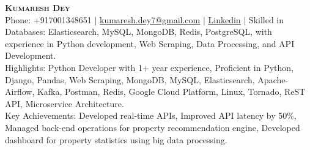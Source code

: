 \documentclass[letterpaper,11pt]{article}
\begin{document}

\begin{center}
	\textbf{\Huge \scshape Kumaresh Dey} \\ \vspace{1pt}
	\small Phone: +917001348651 $|$ \href{mailto:kumaresh.dey7@gmail.com}{\underline{kumaresh.dey7@gmail.com}} $|$
	\href{https://www.linkedin.com/in/kumareshdey}{\underline{Linkedin}} $|$ 
	\small Skilled in Databases: Elasticsearch, MySQL, MongoDB, Redis, PostgreSQL, with experience in Python development, Web Scraping, Data Processing, and API Development. \\ 
	\small Highlights: Python Developer with 1+ year experience, Proficient in Python, Django, Pandas, Web Scraping, MongoDB, MySQL, Elasticsearch, Apache-Airflow, Kafka, Postman, Redis, Google Cloud Platform, Linux, Tornado, ReST API, Microservice Architecture. \\ 
	\small Key Achievements: Developed real-time APIs, Improved API latency by 50\%, Managed back-end operations for property recommendation engine, Developed dashboard for property statistics using big data processing. \\

\end{center}
\end{document}
